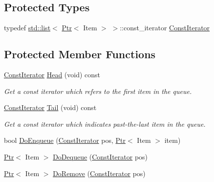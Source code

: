 \subsection*{Protected Types}
\begin{DoxyCompactItemize}
\item 
typedef \hyperlink{openflow-interface_8h_afd9bcfa176617760671b67580f536fa7}{std\+::list}$<$ \hyperlink{classns3_1_1Ptr}{Ptr}$<$ Item $>$ $>$\+::const\+\_\+iterator \hyperlink{classns3_1_1Queue_af108d00696b556f3b3addd8816413119}{Const\+Iterator}
\end{DoxyCompactItemize}
\subsection*{Protected Member Functions}
\begin{DoxyCompactItemize}
\item 
\hyperlink{classns3_1_1Queue_af108d00696b556f3b3addd8816413119}{Const\+Iterator} \hyperlink{classns3_1_1Queue_a22bfb0852a9de53cf9f44e6166279a4f}{Head} (void) const 
\begin{DoxyCompactList}\small\item\em Get a const iterator which refers to the first item in the queue. \end{DoxyCompactList}\item 
\hyperlink{classns3_1_1Queue_af108d00696b556f3b3addd8816413119}{Const\+Iterator} \hyperlink{classns3_1_1Queue_a34b4a2b16dc1d51f02a18358d66faf46}{Tail} (void) const 
\begin{DoxyCompactList}\small\item\em Get a const iterator which indicates past-\/the-\/last item in the queue. \end{DoxyCompactList}\item 
bool \hyperlink{classns3_1_1Queue_ac86c2c694f8162ae675526c67142b26b}{Do\+Enqueue} (\hyperlink{classns3_1_1Queue_af108d00696b556f3b3addd8816413119}{Const\+Iterator} pos, \hyperlink{classns3_1_1Ptr}{Ptr}$<$ Item $>$ item)
\item 
\hyperlink{classns3_1_1Ptr}{Ptr}$<$ Item $>$ \hyperlink{classns3_1_1Queue_a7d5e900f5ebc08733bcc8ead96997447}{Do\+Dequeue} (\hyperlink{classns3_1_1Queue_af108d00696b556f3b3addd8816413119}{Const\+Iterator} pos)
\item 
\hyperlink{classns3_1_1Ptr}{Ptr}$<$ Item $>$ \hyperlink{classns3_1_1Queue_aeafca6fdd31674467fb5251b14ba5899}{Do\+Remove} (\hyperlink{classns3_1_1Queue_af108d00696b556f3b3addd8816413119}{Const\+Iterator} pos)
\item 

\end{DoxyCompactItemize}
